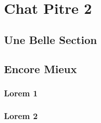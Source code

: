 \chapter{Chat Pitre 2}
\label{chap:two}

\section{Une Belle Section}
\label{sec:example}

\lipsum[1-5]

\section{Encore Mieux}
\label{sec:interesting}

\subsection{Lorem 1}
\label{sec:lorem1}

\lipsum[10-15]

\subsection{Lorem 2}
\label{sec:lorem2}

\lipsum[16-21]
